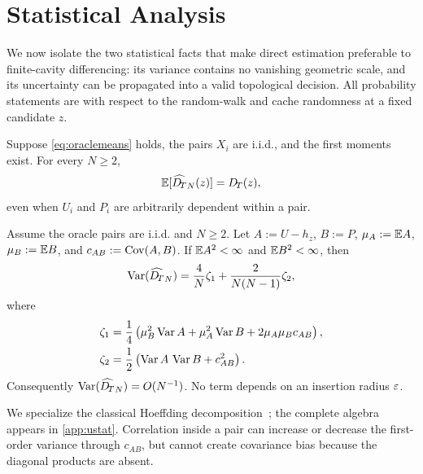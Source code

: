 \section{Statistical Analysis}
\label{sec:analysis}

We now isolate the two statistical facts that make direct estimation
preferable to finite-cavity differencing: its variance contains no vanishing
geometric scale, and its uncertainty can be propagated into a valid
topological decision.  All probability statements are with respect to the
random-walk and cache randomness at a fixed candidate $z$.

\begin{theorem}
\label{thm:unbiased}
Suppose \cref{eq:oraclemeans} holds, the pairs $X_i$ are i.i.d., and the first
moments exist.  For every $N\ge2$,
\begin{equation}
 \mathbb{E}[\widehat{D_{\!T}}_N(z)]=D_{\!T}(z),
\end{equation}
even when $U_i$ and $P_i$ are arbitrarily dependent within a pair.
\end{theorem}

\begin{theorem}
\label{thm:variance}
Assume the oracle pairs are i.i.d. and $N\ge2$. Let $A:=U-h_z$, $B:=P$, $\mu_A:=\mathbb{E} A$, $\mu_B:=\mathbb{E} B$, and
$c_{AB}:=\operatorname{Cov}(A,B)$.  If $\mathbb{E} A^2<\infty$ and $\mathbb{E} B^2<\infty$, then
\begin{equation}
 \operatorname{Var}(\widehat{D_{\!T}}_N)
 =\frac{4}{N}\zeta_1
  +\frac{2}{N(N-1)}\zeta_2,
 \label{eq:ustatvariance}
\end{equation}
where
\begin{align}
 \zeta_1
 &=\frac14\left(
 \mu_B^2\operatorname{Var} A+\mu_A^2\operatorname{Var} B
 +2\mu_A\mu_Bc_{AB}\right),
 \label{eq:zetaone}\\
 \zeta_2
 &=\frac12\left(\operatorname{Var} A\,\operatorname{Var} B+c_{AB}^2\right).
 \label{eq:zetatwo}
\end{align}
Consequently $\operatorname{Var}(\widehat{D_{\!T}}_N)=O(N^{-1})$.  No term depends on an
insertion radius $\varepsilon$.
\end{theorem}

We specialize the classical Hoeffding decomposition~\cite{hoeffding1948class};
the complete algebra appears in \cref{app:ustat}.  Correlation inside a pair can
increase or decrease the first-order variance through $c_{AB}$, but cannot
create covariance bias because the diagonal products are absent.

